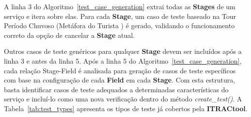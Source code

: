 A linha 3 do Algoritmo~\ref{test_case_generation} extrai todas as \textbf{Stages} de um serviço e itera sobre elas. Para cada \textbf{Stage}, um caso de teste baseado na Tour Período Chuvoso (Metáfora do Turista \cite{whittaker2009exploratory}) é gerado, validando o funcionamento correto da opção de cancelar a \textbf{Stage} atual.

Outros casos de teste genéricos para qualquer \textbf{Stage} devem ser incluídos após a linha 3 e antes da linha 5. Após a linha 5 do Algoritmo~\ref{test_case_generation}, cada relação Stage-Field é analisada para geração de casos de teste específicos com base na configuração de cada \textbf{Field} em cada \textbf{Stage}. Com esta estrutura, basta identificar casos de teste adequados a determinadas características do serviço e incluí-lo como uma nova verificação dentro do método \textit{create\_test()}. A Tabela~\ref{tab:test_types} apresenta os tipos de teste já cobertos pela \textbf{ITRACtool}.


